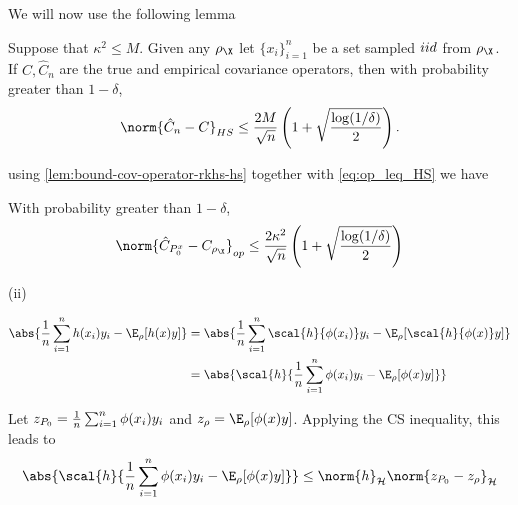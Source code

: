 We will now use the following lemma
\begin{lemma}
  \label{lem:bound-cov-operator-rkhs-hs}
  Suppose that \(\kappa^{2} \leq M\). Given any \(\rho_{\X}\) let \(\{x_{i}\}_{i=1}^{n}\) be a set sampled \(iid\) from \(\rho_{\X}\). If \(C,
  \hat{C}_{n}\) are the true and empirical covariance operators, then with
  probability greater than \(1 - \delta\),
  \begin{equation*}
    \label{eq:bound-cov-operator-rkhs-hs}
    \norm{\hat{C}_{n} - C}_{HS} \leq \frac{2M}{\sqrt{n}}\left( 1 + \sqrt{\frac{\log(1/\delta)}{2}} \right).
  \end{equation*}
\end{lemma}
using \ref{lem:bound-cov-operator-rkhs-hs} together with \ref{eq:op_leq_HS} we have
\begin{corollary}
  \label{cor:bound-cov-op-diff-in-prob}
  With probability greater than \(1 - \delta\),
  \begin{equation}
    \label{eq:bound-cov-op-diff-in-prob}
    \norm{\hat{C}_{\poolsetx_{0}} - C_{\rho_{\X}}}_{op} \leq \frac{2\kappa^{2}}{\sqrt{n}}\left( 1 + \sqrt{\frac{\log(1/\delta)}{2}} \right)
  \end{equation}
\end{corollary}

\begin{description}
\item[{(ii)}] 
\end{description}
\begin{align*}
  \abs{\frac{1}{n} \sum_{i=1}^n h(x_i)y_i - \E_{\rho}[h(x)y]} & = \abs{\frac{1}{n} \sum_{i=1}^n \scal{ h}{ \phi(x_i) } y_i - \E_{\rho}[\scal{ h}{ \phi(x) } y]} \\
                                                              & = \abs{\scal{ h}{ \frac{1}{n} \sum_{i=1}^n \phi(x_i) y_i - \E_{\rho}[\phi(x) y] }}
\end{align*}

Let \(z_{P_{0}} = \frac{1}{n} \sum_{i=1}^n \phi(x_i) y_i\) and
\(z_{\rho} = \E_{\rho}[\phi(x) y]\). Applying the CS inequality, this leads to
\begin{equation*}
  \abs{\scal{h}{\frac{1}{n} \sum_{i=1}^n \phi(x_i) y_i - \E_{\rho}[\phi(x) y] }} \leq \norm{h}_{\rkhs{H}}\norm{z_{\poolset_0} - z_{\rho}}_{\rkhs{H}}
\end{equation*}


